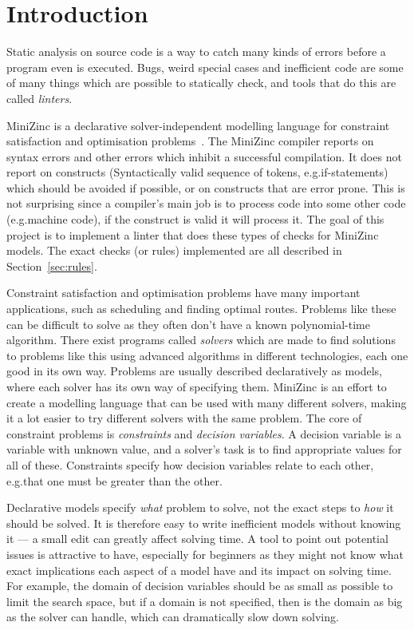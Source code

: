 \documentclass[a4paper,12pt]{article}
\begin{document}
\section{Introduction}\label{sec:introduktion}
Static analysis on source code is a way to catch many kinds of errors before
a program even is executed.
Bugs, weird special cases and inefficient code are some of many things which are possible
to statically check, and tools that do this are called \emph{linters}.

MiniZinc is a declarative solver-independent modelling language for constraint
satisfaction and optimisation problems~\cite{MiniZinc}. The MiniZinc compiler reports on syntax errors
and other errors which inhibit a successful compilation. It does not report on
constructs (Syntactically valid sequence of tokens, e.g.\@ if-statements)
which should be avoided if possible, or on constructs that are error prone.
This is not surprising since a compiler's main job is to process code into some other code
(e.g.\@ machine code), if the construct is valid it will process it.
The goal of this project is to implement a linter that does these types of checks for
MiniZinc models. The exact checks (or rules) implemented are all described in
Section~\ref{sec:rules}.

Constraint satisfaction and optimisation problems have many important applications, such as
scheduling and finding optimal routes. Problems like
these can be difficult to solve as they often don't have a known
polynomial-time algorithm. There exist programs
called \emph{solvers} which are made to find solutions to problems like this using
advanced algorithms in different technologies, each one good in its own way.
Problems are usually described declaratively as models, where each solver has
its own way of specifying them. MiniZinc is an effort to
create a modelling language that can be used with many different solvers, making it a lot
easier to try different solvers with the same problem. The core of constraint problems is
\emph{constraints} and \emph{decision variables}. A decision variable is a variable with
unknown value, and a solver's task is to find appropriate values for all of these.
Constraints specify how decision variables relate to each other, e.g.\@ that one must be
greater than the other.

Declarative models specify \emph{what} problem to solve, not the exact steps to \emph{how}
it should be solved. It is therefore easy to write inefficient models without
knowing it --- a small edit can greatly affect solving time. A tool to point out
potential issues is attractive to have, especially for beginners as they might not know what exact
implications each aspect of a model have and its impact on solving time. For example, the
domain of decision variables should be as small as possible to limit the search space,
but if a domain is not specified, then is the domain as big as the solver can handle, which can
dramatically slow down solving.
\end{document}
